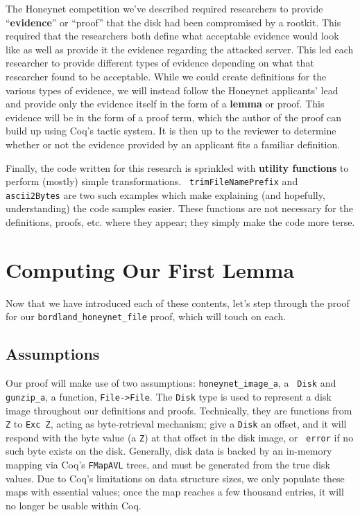 \documentclass[nocopyrightspace]{sigplanconf}
\begin{document}
The Honeynet competition we've described required researchers to provide
``{\bf evidence}'' or ``proof'' that the disk had been compromised by a
rootkit. This required that the researchers both define what acceptable
evidence would look like as well as provide it the evidence regarding the
attacked server. This led each researcher to provide different types of
evidence depending on what that researcher found to be acceptable. While we
could create definitions for the various types of evidence, we will instead
follow the Honeynet applicants' lead and provide only the evidence itself in
the form of a {\bf lemma} or proof. This evidence will be in the form of a
proof term, which the author of the proof can build up using Coq's tactic
system. It is then up to the reviewer to determine whether or not the evidence
provided by an applicant fits a familiar definition.

Finally, the code written for this research is sprinkled with {\bf utility
functions} to perform (mostly) simple transformations. {\tt
trimFileNamePrefix} and {\tt ascii2Bytes} are two such examples which make
explaining (and hopefully, understanding) the code samples easier. These
functions are not necessary for the definitions, proofs, etc. where they
appear; they simply make the code more terse.

\section{Computing Our First Lemma}

Now that we have introduced each of these contents, let's step through the
proof for our {\tt bordland\_honeynet\_file} proof, which will touch on each.

\subsection{Assumptions}
Our proof will make use of two assumptions: {\tt honeynet\_image\_a}, a {\tt
Disk} and {\tt gunzip\_a}, a function, {\tt File->File}. The {\tt Disk} type
is used to represent a disk image throughout our definitions and proofs.
Technically, they are functions from {\tt Z} to {\tt Exc Z}, acting as
byte-retrieval mechanism; give a {\tt Disk} an offset, and it will respond
with the byte value (a {\tt Z}) at that offset in the disk image, or {\tt
error} if no such byte exists on the disk. Generally, disk data is backed by
an in-memory mapping via Coq's {\tt FMapAVL} trees, and must be generated from
the true disk values. Due to Coq's limitations on data structure sizes, we
only populate these maps with essential values; once the map reaches a few
thousand entries, it will no longer be usable within Coq.
\end{document}
